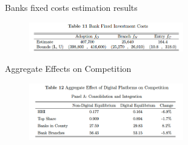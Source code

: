 \documentclass[notes,10pt, aspectratio=169]{beamer}
\begin{document}
            \begin{frame}{Banks fixed costs estimation results}\label{fixed_costs}

                \begin{figure}
                    \centering
                    \includegraphics[width=0.6\textwidth]{imgs/tab11.png}
                \end{figure}
                
            \end{frame}

            \begin{frame}{Aggregate Effects on Competition}\label{agg_effects}

                \begin{figure}
                    \centering
                    \includegraphics[width=0.6\textwidth]{imgs/tab12.png}
                \end{figure}
                
            \end{frame}
\end{document}
